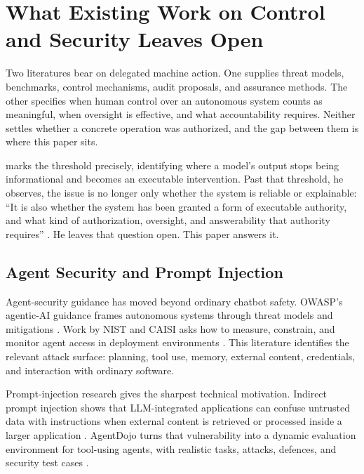 \section{What Existing Work on Control and Security Leaves Open}

Two literatures bear on delegated machine action. One supplies threat models, benchmarks, control mechanisms, audit proposals, and assurance methods. The other specifies when human control over an autonomous system counts as meaningful, when oversight is effective, and what accountability requires. Neither settles whether a concrete operation was authorized, and the gap between them is where this paper sits.

\Textcite{rashid2026recommenderActor} marks the threshold precisely, identifying where a model's output stops being informational and becomes an executable intervention. Past that threshold, he observes, the issue is no longer only whether the system is reliable or explainable: \enquote{It is also whether the system has been granted a form of executable authority, and what kind of authorization, oversight, and answerability that authority requires} \citep[3]{rashid2026recommenderActor}. He leaves that question open. This paper answers it.

\subsection{Agent Security and Prompt Injection}

Agent-security guidance has moved beyond ordinary chatbot safety. OWASP's agentic-AI guidance frames autonomous systems through threat models and mitigations \parencite{owasp2025agentic}. Work by NIST and CAISI asks how to measure, constrain, and monitor agent access in deployment environments \parencite{nistCaisi2026agents}. This literature identifies the relevant attack surface: planning, tool use, memory, external content, credentials, and interaction with ordinary software.

Prompt-injection research gives the sharpest technical motivation. Indirect prompt injection shows that LLM-integrated applications can confuse untrusted data with instructions when external content is retrieved or processed inside a larger application \parencite{greshake2023not}. AgentDojo turns that vulnerability into a dynamic evaluation environment for tool-using agents, with realistic tasks, attacks, defences, and security test cases \parencite{debenedetti2024agentdojo}.

